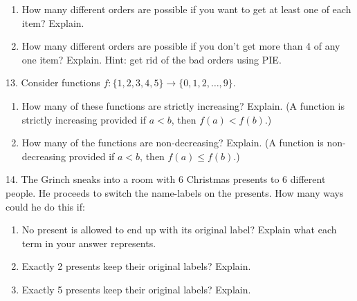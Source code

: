 \documentclass[10pt,]{book}
\theoremstyle{plain}
\theoremstyle{definition}
\theoremstyle{definition}
\theoremstyle{definition}
\numberwithin{equation}{section}
\newcommand{\lt}{ < }
\begin{document}
\begin{exerciselist}
\begin{enumerate}[label=(\alph*)]
                
\item\hypertarget{li-803}{}
                How many different orders are possible if you want to get at least one of each item? Explain.

                
\item\hypertarget{li-804}{}
                How many different orders are possible if you don't get more than 4 of any one item? Explain. Hint: get rid of the bad orders using PIE.

                
\end{enumerate}
\par\smallskip
\item[13.]\hypertarget{exercise-136}{}
            Consider functions \(f:\{1,2,3,4,5\} \to \{0,1,2,\ldots,9\}\).
\leavevmode%
\begin{enumerate}[label=(\alph*)]
\item\hypertarget{li-805}{}
                How many of these functions are strictly increasing? Explain. (A function is strictly increasing provided if \(a \lt  b\), then \(f(a) \lt  f(b)\).)

                
\item\hypertarget{li-806}{}
                How many of the functions are non-decreasing? Explain. (A function is non-decreasing provided if \(a \lt  b\), then \(f(a) \le f(b)\).)

                
\end{enumerate}
\par\smallskip
\item[14.]\hypertarget{exercise-137}{}
            The Grinch sneaks into a room with 6 Christmas presents to 6 different people. He proceeds to switch the name-labels on the presents. How many ways could he do this if:
\leavevmode%
\begin{enumerate}[label=(\alph*)]
\item\hypertarget{li-807}{}
                No present is allowed to end up with its original label? Explain what each term in your answer represents.

                
\item\hypertarget{li-808}{}
                Exactly 2 presents keep their original labels? Explain.

                
\item\hypertarget{li-809}{}
                Exactly 5 presents keep their original labels? Explain.

                
\end{enumerate}
\par\smallskip
\end{exerciselist}
%
%
%
\appendix
%
\typeout{************************************************}
\typeout{************************************************}
\end{document}
